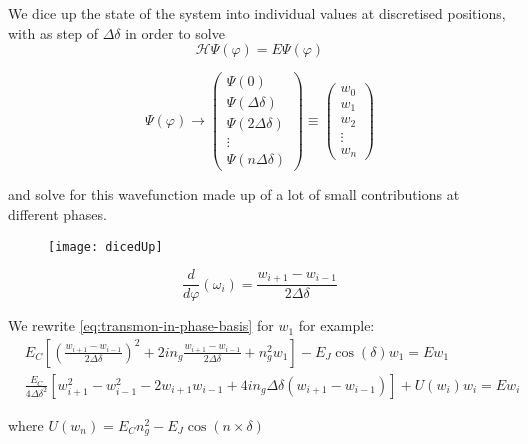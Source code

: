  \begin{framed}\noindent
   We  dice  up the  state  of  the  system  into individual  values  at
   discretised positions, with as step of  $ \Delta \delta $ in order to
   solve
   \begin{equation}
     \mathcal{H}\Psi(\varphi) = E\Psi(\varphi)
   \end{equation}

\[
  \Psi(\varphi) \rightarrow \begin{pmatrix}
    \Psi(0)\\
    \Psi(\Delta \delta)\\
    \Psi(2\Delta \delta)\\\vdots
    \\
    \Psi(n\Delta \delta)
  \end{pmatrix}
  \equiv
  \begin{pmatrix}
    w_0\\
    w_1\\
    w_2\\
    \vdots\\
    w_{n}
  \end{pmatrix}
\]

\noindent and  solve for  this wavefunction  made up of  a lot  of small
contributions at different phases.
\end{framed}

\begin{figure}[h]
  \centering \texttt{[image: dicedUp]}
\end{figure}

\begin{equation}
  \frac{d}{d\varphi}\left(\omega_i\right) = \frac{w_{i+1} - w_{i-1}}{2\Delta\delta}
\end{equation}

\noindent We rewrite  \autoref{eq:transmon-in-phase-basis} for $w_1$ for
example:
\begin{equation}
  \begin{aligned}
    & E_C\left[\left(\frac{w_{i+1}-w_{i-1}}{2\Delta\delta} \right)^{2} + 2in_{g}\frac{w_{i+1}-w_{i-1}}{2\Delta\delta} + n_{g}^2w_1  \right] - E_J\cos(\delta)w_1 = Ew_1 \\
    &    \frac{E_C}{4\Delta\delta^{2}}\left[    w_{i+1}^2-w_{i-1}^2    -
      2w_{i+1}w_{i-1}+  4in_{g}\Delta\delta(w_{i+1}-w_{i-1})  \right]  +
    U(w_{i})w_i = Ew_{i}
  \end{aligned}
\end{equation}

\noindent where $U(w_n) = E_Cn_{g}^2-E_J\cos(n\times\delta)$

